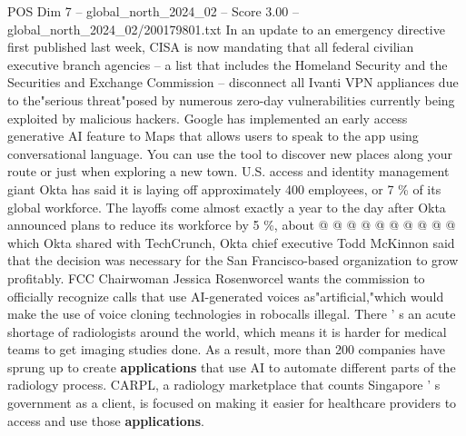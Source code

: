 \begin{textsample}{POS Dim 7 – global\_north\_2024\_02 – Score 3.00 – global\_north\_2024\_02/200179801.txt}
In an update to an emergency directive first published last week, CISA is now mandating that all federal civilian executive branch agencies -- a list that includes the Homeland Security and the Securities and Exchange Commission -- disconnect all Ivanti VPN appliances due to the"serious threat"posed by numerous zero-day vulnerabilities currently being exploited by malicious hackers.
Google has implemented an early access generative AI feature to Maps that allows users to speak to the app using conversational language.
You can use the tool to discover new places along your route or just when exploring a new town.
U.S. access and identity management giant Okta has said it is laying off approximately 400 employees, or 7 \% of its global workforce.
The layoffs come almost exactly a year to the day after Okta announced plans to reduce its workforce by 5 \%, about @ @ @ @ @ @ @ @ @ @ which Okta shared with TechCrunch, Okta chief executive Todd McKinnon said that the decision was necessary for the San Francisco-based organization to grow profitably.
FCC Chairwoman Jessica Rosenworcel wants the commission to officially recognize calls that use AI-generated voices as"artificial,"which would make the use of voice cloning technologies in robocalls illegal.
There ' s an acute shortage of radiologists around the world, which means it is harder for medical teams to get imaging studies done.
As a result, more than 200 companies have sprung up to create \textbf{applications} that use AI to automate different parts of the radiology process.
CARPL, a radiology marketplace that counts Singapore ' s government as a client, is focused on making it easier for healthcare providers to access and use those \textbf{applications}.

\end{textsample}

